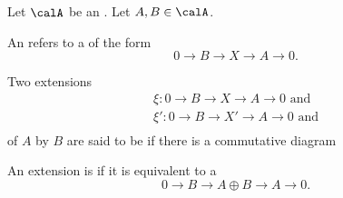 \begin{definition} \label{definition:extension_of_objects_in_an_additive_category}
    Let $\calA$ be an . Let $A,B \in \calA$. 

    An  refers to a  of the form 
    $$0 \to B \to X \to A \to 0.$$ 

    Two extensions 
    \begin{align*}
    \xi: 0 \to B \to X \to A \to 0 \text{ and} \\
    \xi': 0 \to B \to X' \to A \to 0 \text{ and} \\
    \end{align*}
    of $A$ by $B$ are said to be  if there is a commutative diagram
    \begin{center}
    \end{center}

    An extension is  if it is equivalent to a  
    $$0 \to B \to A \oplus B \to A \to 0.$$
\end{definition}